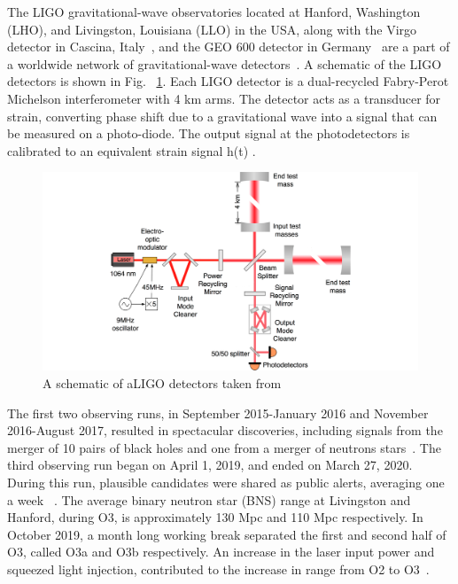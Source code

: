 \documentclass[12pt]{iopart}
\begin{document}
The LIGO  gravitational-wave observatories located at Hanford, Washington (LHO), and Livingston, Louisiana (LLO) in the USA, along with the Virgo detector in Cascina, Italy~\cite{virgo}, and the GEO 600 detector in Germany~\cite{german} are a part of a worldwide network of gravitational-wave detectors~\cite{aligo}. 
A schematic of the LIGO detectors is shown in Fig. ~\ref{fig:schematic}.
Each LIGO detector is a dual-recycled Fabry-Perot Michelson interferometer with 4 km arms. The detector acts as a transducer for strain, converting phase shift due to a gravitational wave into a signal that can be measured on a photo-diode. The output signal at the photodetectors is calibrated to an equivalent strain signal h(t) \cite{Abbott_2017,Viets_2018}.

\begin{figure}[h]
    \centering
    \includegraphics[width=12cm]{ligo-schematic.png}
    \caption{A schematic of aLIGO detectors taken from {~\cite{Martynov_2016}} }
    \label{fig:schematic}
\end{figure}


The first two observing runs, in September 2015-January 2016 and November 2016-August 2017, resulted in spectacular discoveries, including signals from the merger of 10 pairs of black holes and one from a merger of neutrons stars~\cite{catalogue,firstpaper,neturonpaper}. The third observing run began on April 1, 2019, and ended on March 27, 2020. During this run, plausible candidates were shared as public alerts, averaging one a week ~\cite{gracedb}. The average binary neutron star (BNS) range at Livingston and Hanford, during O3, is approximately 130 Mpc and 110 Mpc respectively. In October 2019, a month long working break separated the first and second half of O3, called O3a and O3b respectively. An increase in the laser input power and squeezed light injection, contributed to the increase in range from O2 to O3~\cite{prospect}.
\end{document}
